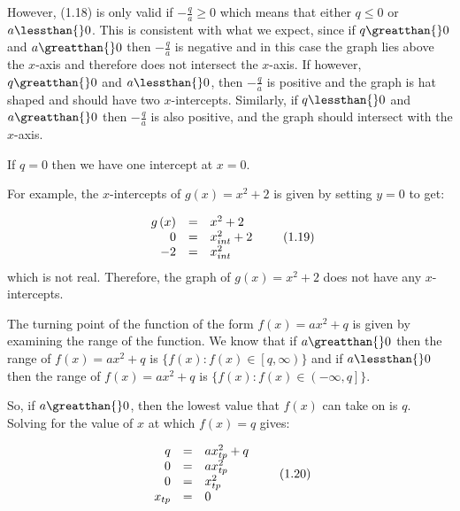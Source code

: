\label{m39345*id243360}However, (1.18) is only valid if $-\frac{q}{a}\ge 0$ which means that either $q\le 0$ or $a\lessthan{}0$. This is consistent with what we expect, since if $q\greatthan{}0$ and $a\greatthan{}0$ then $-\frac{q}{a}$ is negative and in this case the graph lies above the $x$-axis and therefore does not intersect the $x$-axis. If however, $q\greatthan{}0$ and $a\lessthan{}0$, then $-\frac{q}{a}$ is positive and the graph is hat shaped and should have two $x$-intercepts. Similarly, if $q\lessthan{}0$ and $a\greatthan{}0$ then $-\frac{q}{a}$ is also positive, and the graph should intersect with the $x$-axis.\par 
\label{m39345*id243593}If $q=0$ then we have one intercept at $x=0$.\par 
\label{m39345*id243626}For example, the $x$-intercepts of $g\left(x\right)={x}^{2}+2$ is given by setting $y=0$ to get:\par 
\label{m39345*id243687}\nopagebreak\noindent{}
\begin{equation}
\begin{array}{ccc}\hfill g\left(x\right)& =& {x}^{2}+2\hfill \\ \hfill 0& =& x_{int}^{2}+2\hfill \\ \hfill -2& =& x_{int}^{2}\hfill \end{array}\tag{1.19}
\end{equation}
\label{m39345*id243798}which is not real. Therefore, the graph of $g\left(x\right)={x}^{2}+2$ does not have any $x$-intercepts.\par 
\label{m39345*uid121}
\nopagebreak
\label{m39345*id243854}The turning point of the function of the form $f\left(x\right)=a{x}^{2}+q$ is given by examining the range of the function. We know that if $a\greatthan{}0$ then the range of $f\left(x\right)=a{x}^{2}+q$ is $\{f\left(x\right):f\left(x\right)\in \left[q,\infty \right)\}$ and if $a\lessthan{}0$ then the range of $f\left(x\right)=a{x}^{2}+q$ is $\{f\left(x\right):f\left(x\right)\in \left(-\infty ,q\right]\}$.\par 
\label{m39345*id244081}So, if $a\greatthan{}0$, then the lowest value that $f\left(x\right)$ can take on is $q$. Solving for the value of $x$ at which $f\left(x\right)=q$ gives:\par 
\label{m39345*id244157}\nopagebreak\noindent{}
\begin{equation}
\begin{array}{ccc}\hfill q& =& ax_{tp}^{2}+q\hfill \\ \hfill 0& =& ax_{tp}^{2}\hfill \\ \hfill 0& =& x_{tp}^{2}\hfill \\ \hfill {x}_{tp}& =& 0\hfill \end{array}\tag{1.20}
\end{equation}
